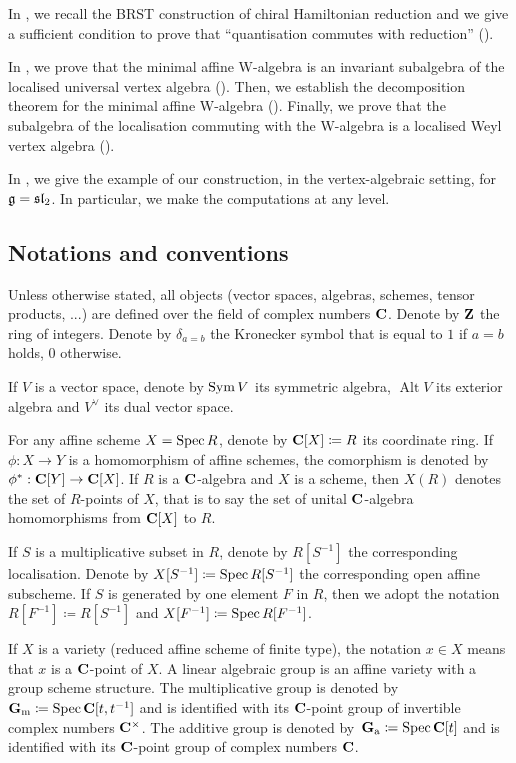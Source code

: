 In , we recall the BRST construction of chiral Hamiltonian reduction and we give a sufficient condition to prove that ``quantisation commutes with reduction'' ().

In , we prove that the minimal affine W-algebra is an invariant subalgebra of the localised universal vertex algebra (). Then, we establish the decomposition theorem for the minimal affine W-algebra (). Finally, we prove that the subalgebra of the localisation commuting with the W-algebra is a localised Weyl vertex algebra ().

In , we give the example of our construction, in the vertex-algebraic setting, for $\mathfrak g = \mathfrak{sl}_2$. In particular, we make the computations at any level.

\subsection{Notations and conventions}

Unless otherwise stated, all objects (vector spaces, algebras, schemes, tensor products, ...) are defined over the field of complex numbers $\mathbf{C}$. Denote by $\mathbf{Z}$ the ring of integers. Denote by $\delta_{a=b}$ the Kronecker symbol that is equal to $1$ if $a=b$ holds, $0$ otherwise. 

If $V$ is a vector space, denote by $\operatorname{Sym} V$ its symmetric algebra, $\operatorname{Alt} V$ its exterior algebra and $V^\vee$ its dual vector space.

For any affine scheme $X = \operatorname{Spec} R$, denote by $\mathbf{C}[X] \coloneqq R$ its coordinate ring. If $\phi : X \rightarrow Y$ is a homomorphism of affine schemes, the comorphism is denoted by~$\phi^* : \mathbf{C}[Y] \rightarrow \mathbf{C}[X]$. If $R$ is a $\mathbf{C}$-algebra and $X$ is a scheme, then $X(R)$ denotes the set of $R$-points of $X$, that is to say the set of unital $\mathbf{C}$-algebra homomorphisms from $\mathbf{C}[X]$ to $R$.

If $S$ is a multiplicative subset in $R$, denote by $R[S^{-1}]$ the corresponding localisation. Denote by $X[S^{-1}] \coloneqq \operatorname{Spec} R[S^{-1}]$ the corresponding open affine subscheme. If $S$ is generated by one element $F$ in $R$, then we adopt the notation $R[F^{-1}] \coloneqq R[S^{-1}]$ and $X[F^{-1}] \coloneqq \operatorname{Spec} R[F^{-1}]$.  

If $X$ is a variety (reduced affine scheme of finite type), the notation $x \in X$ means that $x$ is a $\mathbf{C}$-point of $X$.  A linear algebraic group is an affine variety with a group scheme structure. The multiplicative group is denoted by~$\mathbf{G}_\mathrm{m} \coloneqq \operatorname{Spec} \mathbf{C}[t, t^{-1}]$ and is identified with its $\mathbf{C}$-point group of invertible complex numbers $\mathbf{C}^\times$. The additive group is denoted by~$\mathbf{G}_\mathrm{a} \coloneqq \operatorname{Spec} \mathbf{C}[t]$ and is identified with its $\mathbf{C}$-point group of complex numbers $\mathbf{C}$.

